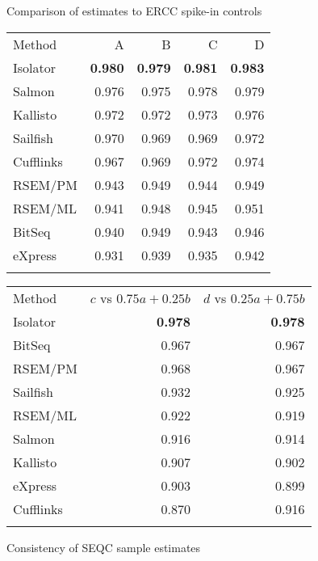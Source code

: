 \documentclass[twocolumn]{article}
\begin{document}
\begin{figure*}
\begin{subtable}{0.5\linewidth}
\caption{Comparison of estimates to ERCC spike-in controls}
\begin{tabular}[c]{@{}lrrrr@{}}
\toprule\addlinespace
Method & A & B & C & D
\\\addlinespace
\midrule
Isolator & \textbf{0.980} & \textbf{0.979} & \textbf{0.981} &
\textbf{0.983}
\\\addlinespace
Salmon & 0.976 & 0.975 & 0.978 & 0.979
\\\addlinespace
Kallisto & 0.972 & 0.972 & 0.973 & 0.976
\\\addlinespace
Sailfish & 0.970 & 0.969 & 0.969 & 0.972
\\\addlinespace
Cufflinks & 0.967 & 0.969 & 0.972 & 0.974
\\\addlinespace
RSEM/PM & 0.943 & 0.949 & 0.944 & 0.949
\\\addlinespace
RSEM/ML & 0.941 & 0.948 & 0.945 & 0.951
\\\addlinespace
BitSeq & 0.940 & 0.949 & 0.943 & 0.946
\\\addlinespace
eXpress & 0.931 & 0.939 & 0.935 & 0.942
\\\addlinespace
\bottomrule
\addlinespace
\end{tabular}
\label{table:ercc}
\end{subtable}
\begin{subtable}{0.5\linewidth}
\caption{Consistency of SEQC sample estimates}
\begin{tabular}[c]{@{}lrr@{}}
\toprule\addlinespace
Method & $c$ vs $0.75a + 0.25b$ & $d$ vs $0.25a + 0.75b$
\\\addlinespace
\midrule
Isolator & \textbf{0.978} & \textbf{0.978}
\\\addlinespace
BitSeq & 0.967 & 0.967
\\\addlinespace
RSEM/PM & 0.968 & 0.967
\\\addlinespace
Sailfish & 0.932 & 0.925
\\\addlinespace
RSEM/ML & 0.922 & 0.919
\\\addlinespace
Salmon & 0.916 & 0.914
\\\addlinespace
Kallisto & 0.907 & 0.902
\\\addlinespace
eXpress & 0.903 & 0.899
\\\addlinespace
Cufflinks & 0.870 & 0.916
\\\addlinespace
\bottomrule
\addlinespace
\end{tabular}
\label{table:seqctranscripts}
\end{subtable}


\end{figure*}
\end{document}
